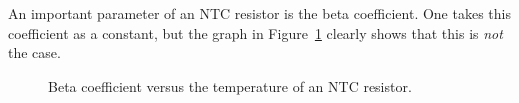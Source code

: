 \documentclass[a4paper]{article}
\begin{document}
An important parameter of an NTC resistor is the beta coefficient. One takes this coefficient as a constant, but the graph in Figure~\ref{fig3} clearly shows that this is \emph{not} the case.

\begin{figure}[!ht]
\caption{Beta coefficient versus the temperature of an NTC resistor.}
\label{fig3}
\end{figure}
\end{document}
